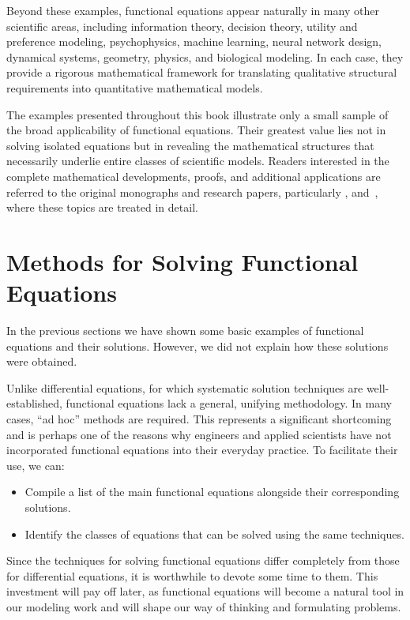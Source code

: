 Beyond these examples, functional equations appear naturally in many other scientific areas, including information theory, decision theory, utility and preference modeling, psychophysics, machine learning, neural network design, dynamical systems, geometry, physics, and biological modeling. In each case, they provide a rigorous mathematical framework for translating qualitative structural requirements into quantitative mathematical models.

The examples presented throughout this book illustrate only a small sample of the broad applicability of functional equations. Their greatest value lies not in solving isolated equations but in revealing the mathematical structures that necessarily underlie entire classes of scientific models. Readers interested in the complete mathematical developments, proofs, and additional applications are referred to the original monographs and research papers, particularly \cite{castillo2004functional}, \cite{castillo1992functional} and~\cite{CastilloRuiz1993}, where these topics are treated in detail.


\section{Methods for Solving Functional Equations}\label{s2.1}

In the previous sections we have shown some basic examples of functional
equations and their solutions. However, we did not explain how
these solutions were obtained.

Unlike differential equations, for which systematic solution techniques
are well-established, functional equations lack a general, unifying
methodology. In many cases, ``ad hoc'' methods are required. This
represents a significant shortcoming and is perhaps one of the reasons
why engineers and applied scientists have not incorporated functional
equations into their everyday practice. To facilitate their use,
we can:
\begin{itemize}
\item Compile a list of the main functional equations alongside their corresponding solutions.
\item Identify the classes of equations that can be solved using the same techniques.
\end{itemize}

Since the techniques for solving functional equations differ completely
from those for differential equations, it is worthwhile to devote
some time to them. This investment will pay off later, as functional
equations will become a natural tool in our modeling work and will
shape our way of thinking and formulating problems.

